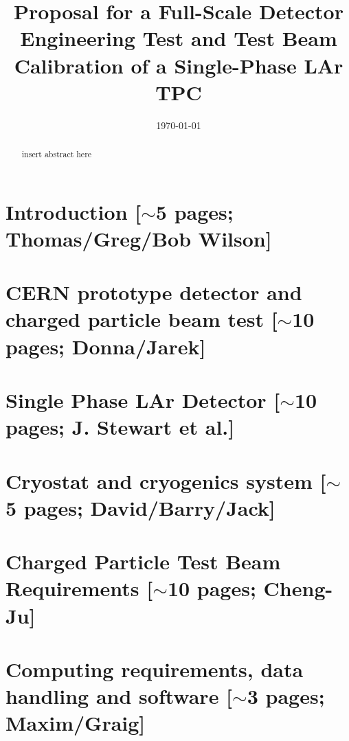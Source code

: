 \documentclass[12pt]{article}
\begin{document}
\title{  Proposal for a Full-Scale Detector Engineering Test and Test Beam Calibration of a Single-Phase LAr TPC}


\date{\today}
	

\maketitle



\begin{abstract}

insert abstract here

\end{abstract}

\newpage
\tableofcontents

\newpage

\section{Introduction [$\sim$5 pages; {\color{red} Thomas/Greg/Bob Wilson}]}
	

\section{CERN prototype detector and charged particle beam test [$\sim$10 pages; {\color{red} Donna/Jarek}]}
	
	

\section{Single Phase LAr Detector [$\sim$10 pages; {\color{red} J. Stewart et al.}]}
	


\section{Cryostat and cryogenics system [$\sim$5 pages; {\color{red} David/Barry/Jack}]}
	


\section{Charged Particle Test Beam Requirements [$\sim$10 pages; {\color{red} Cheng-Ju}]}
	


\section{Computing requirements, data handling and software  [$\sim$3 pages; {\color{red} Maxim/Graig}]}
	
\end{document}

